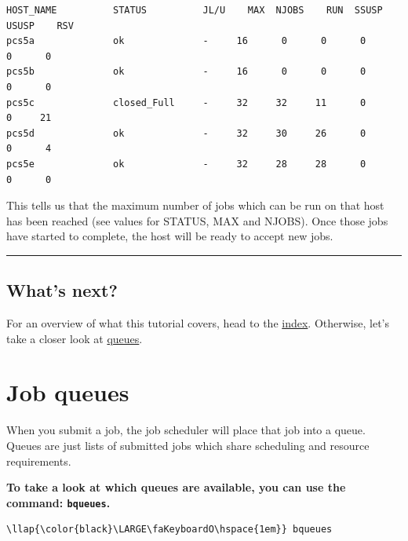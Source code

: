 \documentclass[11pt]{article}
\begin{document}
    \begin{verbatim}
HOST_NAME          STATUS          JL/U    MAX  NJOBS    RUN  SSUSP  USUSP    RSV
pcs5a              ok              -     16      0      0      0      0      0
pcs5b              ok              -     16      0      0      0      0      0
pcs5c              closed_Full     -     32     32     11      0      0     21
pcs5d              ok              -     32     30     26      0      0      4
pcs5e              ok              -     32     28     28      0      0      0
\end{verbatim}

    This tells us that the maximum number of jobs which can be run on that
host has been reached (see values for STATUS, MAX and NJOBS). Once those
jobs have started to complete, the host will be ready to accept new
jobs.

    \begin{center}\rule{0.5\linewidth}{\linethickness}\end{center}

    \subsection{What's next?}\label{whats-next}

For an overview of what this tutorial covers, head to the
\href{index.ipynb}{index}. Otherwise, let's take a closer look at
\href{queues.ipynb}{queues}.





\newpage






    \section{Job queues}\label{job-queues}

When you submit a job, the job scheduler will place that job into a
queue. Queues are just lists of submitted jobs which share scheduling
and resource requirements.

    \textbf{To take a look at which queues are available, you can use the
command: \texttt{bqueues}.}

\begin{terminalinput}
\begin{Verbatim}[commandchars=\\\{\}]
\llap{\color{black}\LARGE\faKeyboardO\hspace{1em}} bqueues
\end{Verbatim}
\end{terminalinput}
\end{document}
